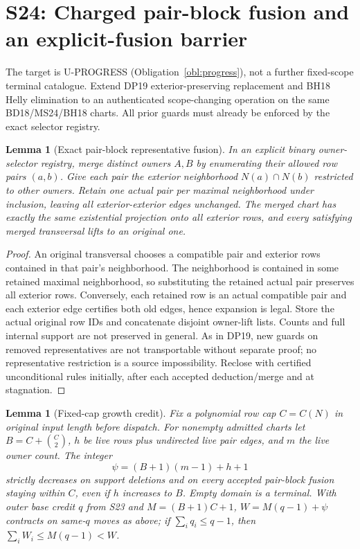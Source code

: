 \documentclass[11pt]{article}
\newtheorem{lemma}[theorem]{Lemma}
\begin{document}
\section{S24: Charged pair-block fusion and an explicit-fusion barrier}\label{sec:s24}
The target is U-PROGRESS (Obligation~\ref{obl:progress}), not a further fixed-scope terminal catalogue. Extend DP19 exterior-preserving replacement and BH18 Helly elimination to an authenticated scope-changing operation on the same BD18/MS24/BH18 charts. All prior guards must already be enforced by the exact selector registry.
\begin{lemma}[Exact pair-block representative fusion]\label{lem:s24-fusion}
In an explicit binary owner-selector registry, merge distinct owners $A,B$ by enumerating their allowed row pairs $(a,b)$. Give each pair the exterior neighborhood $N(a)\cap N(b)$ restricted to other owners. Retain one actual pair per maximal neighborhood under inclusion, leaving all exterior-exterior edges unchanged. The merged chart has exactly the same existential projection onto all exterior rows, and every satisfying merged transversal lifts to an original one.
\end{lemma}
\begin{proof}
An original transversal chooses a compatible pair and exterior rows contained in that pair's neighborhood. The neighborhood is contained in some retained maximal neighborhood, so substituting the retained actual pair preserves all exterior rows. Conversely, each retained row is an actual compatible pair and each exterior edge certifies both old edges, hence expansion is legal. Store the actual original row IDs and concatenate disjoint owner-lift lists. Counts and full internal support are not preserved in general. As in DP19, new guards on removed representatives are not transportable without separate proof; no representative restriction is a source impossibility. Reclose with certified unconditional rules initially, after each accepted deduction/merge and at stagnation.
\end{proof}
\begin{lemma}[Fixed-cap growth credit]\label{lem:s24-credit}
Fix a polynomial row cap $C=C(N)$ in original input length before dispatch. For nonempty admitted charts let $B=C+\binom C2$, $h$ be live rows plus undirected live pair edges, and $m$ the live owner count. The integer
\[
\psi=(B+1)(m-1)+h+1
\]
strictly decreases on support deletions and on every accepted pair-block fusion staying within $C$, even if $h$ increases to $B$. Empty domain is a terminal. With outer base credit $q$ from S23 and $M=(B+1)C+1$, $W=M(q-1)+\psi$ contracts on same-$q$ moves as above; if $\sum_i q_i\le q-1$, then $\sum_i W_i\le M(q-1)<W$.
\end{lemma}
\end{document}
